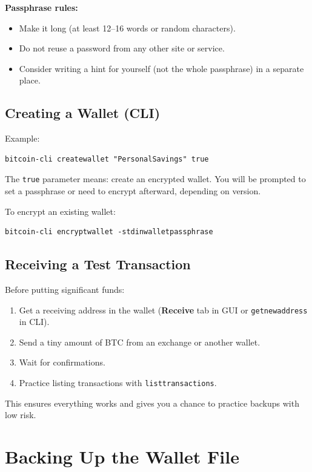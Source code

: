 \documentclass[12pt,a4paper]{book}
\begin{document}
\textbf{Passphrase rules:}
\begin{itemize}
  \item Make it long (at least 12--16 words or random characters).
  \item Do not reuse a password from any other site or service.
  \item Consider writing a hint for yourself (not the whole passphrase) in a separate place.
\end{itemize}

\section{Creating a Wallet (CLI)}

Example:

\begin{lstlisting}[style=bashstyle]
bitcoin-cli createwallet "PersonalSavings" true
\end{lstlisting}

The \texttt{true} parameter means: create an encrypted wallet. You will be prompted to set a passphrase or need to encrypt afterward, depending on version.

To encrypt an existing wallet:

\begin{lstlisting}[style=bashstyle]
bitcoin-cli encryptwallet -stdinwalletpassphrase
\end{lstlisting}

\section{Receiving a Test Transaction}

Before putting significant funds:

\begin{enumerate}
  \item Get a receiving address in the wallet (\textbf{Receive} tab in GUI or \texttt{getnewaddress} in CLI).
  \item Send a tiny amount of BTC from an exchange or another wallet.
  \item Wait for confirmations.
  \item Practice listing transactions with \texttt{listtransactions}.
\end{enumerate}

This ensures everything works and gives you a chance to practice backups with low risk.

\chapter{Backing Up the Wallet File}
\end{document}
